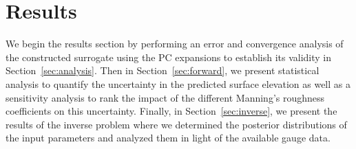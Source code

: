 \section{Results}
\label{sec:results}
We begin the results section by performing
an error and convergence analysis of the
constructed surrogate using the PC expansions
to establish its validity in Section~\ref{sec:analysis}.
Then in Section~\ref{sec:forward}, we present
statistical analysis to quantify the uncertainty in the predicted surface elevation
as well as a sensitivity analysis to rank the impact of the different Manning's 
roughness coefficients on this uncertainty. 
Finally, in Section~\ref{sec:inverse}, we present the results of the inverse
problem where we determined the posterior distributions of the input parameters 
and analyzed them in light of the available gauge data.



